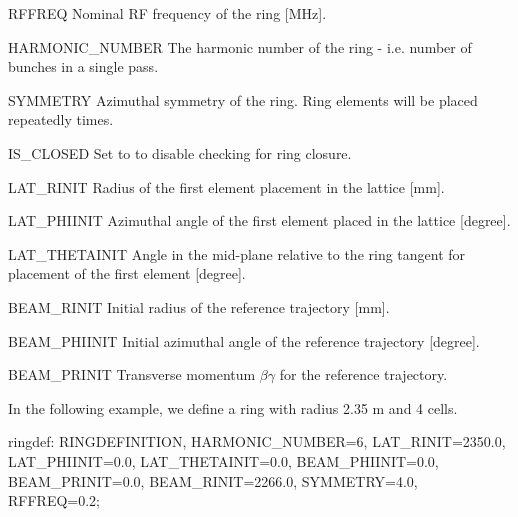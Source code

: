\begin{kdescription}
\item[RFFREQ]
Nominal RF frequency of the ring [\si{\mega\hertz}].

\item[HARMONIC\_NUMBER]
The harmonic number of the ring - i.e. number of bunches in a single pass.

\item[SYMMETRY]
Azimuthal symmetry of the ring. Ring elements will be placed repeatedly
 times.

\item[IS\_CLOSED]
Set to  to disable checking for ring closure.

\item[LAT\_RINIT]
Radius of the first element placement in the lattice [\si{\milli\meter}].

\item[LAT\_PHIINIT]
Azimuthal angle of the first element placed in the lattice [degree].

\item[LAT\_THETAINIT]
Angle in the mid-plane relative to the ring tangent for placement of the first
element [degree].

\item[BEAM\_RINIT]
Initial radius of the reference trajectory [\si{\milli\meter}].

\item[BEAM\_PHIINIT]
Initial azimuthal angle of the reference trajectory [degree].

\item[BEAM\_PRINIT]
Transverse momentum $\beta \gamma$ for the reference trajectory.
\end{kdescription}

In the following example, we define a ring with radius 2.35 m and 4 cells.
\begin{example}
ringdef: RINGDEFINITION, HARMONIC_NUMBER=6, LAT_RINIT=2350.0, LAT_PHIINIT=0.0,
         LAT_THETAINIT=0.0, BEAM_PHIINIT=0.0, BEAM_PRINIT=0.0,
         BEAM_RINIT=2266.0, SYMMETRY=4.0, RFFREQ=0.2;
\end{example}

